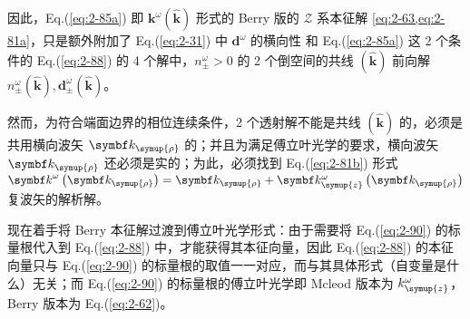 因此，Eq.(\ref{eq:2-85a}) 即 ${\symbf k}^\omega \left( \hat{\symbf k} \right)$ 形式的 Berry 版的 $\mathcal{Z}$ 系本征解 \cref{eq:2-63,eq:2-81a}，只是额外附加了 Eq.(\ref{eq:2-31}) 中 $\symbf d^{\omega}$ 的横向性 和 Eq.(\ref{eq:2-85a}) 这 2 个条件的 Eq.(\ref{eq:2-88}) 的 4 个解中，$n^{\omega}_{\pm} >0$ 的 2 个倒空间的共线 $\left( \hat{\symbf k} \right)$ 前向解 ${n^{\omega}_{\pm} \left( \hat{\symbf k} \right), \symbf d^{\omega}_{\pm}} \left( \hat{\symbf k} \right)$。

然而，为符合端面边界的相位连续条件，2 个透射解不能是共线 $\left( \hat{\symbf k} \right)$ 的，必须是共用横向波矢 $\symbf k_{\symup{\rho}}$ 的；并且为满足傅立叶光学的要求，横向波矢 $\symbf k_{\symup{\rho}}$ 还必须是实的；为此，必须找到 Eq.(\ref{eq:2-81b}) 形式 ${\symbf k}^\omega \left( \symbf k_{\symup{\rho}} \right) = \symbf k_{\symup{\rho}} + \symbf k^\omega_{\symup{z}} \left( \symbf k_{\symup{\rho}} \right)$ 复波矢的解析解。

现在着手将 Berry 本征解过渡到傅立叶光学形式：由于需要将 Eq.(\ref{eq:2-90}) 的标量根代入到 Eq.(\ref{eq:2-88}) 中，才能获得其本征向量，因此 Eq.(\ref{eq:2-88}) 的本征向量只与 Eq.(\ref{eq:2-90}) 的标量根的取值一一对应，而与其具体形式（自变量是什么）无关；而 Eq.(\ref{eq:2-90}) 的标量根的傅立叶光学即 Mcleod 版本为 $k^\omega_{\symup{z}}$，Berry 版本为 Eq.(\ref{eq:2-62})。

